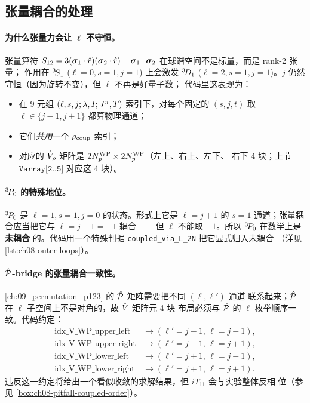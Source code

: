 \subsection{张量耦合的处理}
\label{subsec:ch08-tensor-coupling}

\paragraph{为什么张量力会让 \(\ell\) 不守恒。}
张量算符 \(S_{12} = 3 (\bm{\sigma}_1 \cdot \hat{r})(\bm{\sigma}_2 \cdot \hat{r})
- \bm{\sigma}_1 \cdot \bm{\sigma}_2\) 在球谐空间不是标量，而是 rank-2 张量；
作用在 \({}^{3}\!S_{1}\) (\(\ell=0, s=1, j=1\)) 上会激发 \({}^{3}\!D_{1}\)
(\(\ell=2, s=1, j=1\))。\(j\) 仍然守恒（因为旋转不变），但 \(\ell\) 不再是好量子数；
代码里这表现为：
\begin{itemize}
  \item 在 9 元组 \((\ell, s, j; \lambda, I; J^\pi, T)\) 索引下，对每个固定的 \((s, j, t)\) 取 \(\ell \in \{j-1, j+1\}\) 都算物理通道；
  \item 它们\emph{共用}一个 \(\rho_{\rm coup}\) 索引；
  \item 对应的 \(\hat{V}_\rho\) 矩阵是 \(2 {N_{p}^{\text{WP}}} \times 2 {N_{p}^{\text{WP}}}\)（左上、右上、左下、
        右下 4 块；上节 \(\texttt{Varray[2..5]}\) 对应这 4 块）。
\end{itemize}

\paragraph{\({}^{3}\!P_{0}\) 的特殊地位。}
\({}^{3}\!P_{0}\) 是 \(\ell=1, s=1, j=0\) 的状态。形式上它是
\(\ell = j+1\) 的 \(s=1\) 通道；张量耦合应当把它与 \(\ell=j-1=-1\) 耦合——
但 \(\ell\) 不能取 \(-1\)。所以 \({}^{3}\!P_{0}\) 在数学上是\textbf{未耦合}
的。代码用一个特殊判据 \texttt{coupled\_via\_L\_2N} 把它显式归入未耦合
（详见 \cref{lst:ch08-outer-loops}）。

\paragraph{\(\hat{\mathcal{P}}\)-bridge 的张量耦合一致性。}
\cref{ch:09_permutation_p123} 的 \(\hat{\mathcal{P}}\) 矩阵需要把不同 \((\ell, \ell')\) 通道
联系起来；\(\hat{\mathcal{P}}\) 在 \(\ell\)-子空间上不是对角的，故 \(\hat{V}\) 矩阵元 4 块
布局必须与 \(\hat{\mathcal{P}}\) 的 \(\ell\)-枚举顺序一致。代码约定：
\begin{align*}
\text{idx\_V\_WP\_upper\_left}  &\to (\ell' = j-1,\, \ell = j-1), \\
\text{idx\_V\_WP\_upper\_right} &\to (\ell' = j-1,\, \ell = j+1), \\
\text{idx\_V\_WP\_lower\_left}  &\to (\ell' = j+1,\, \ell = j-1), \\
\text{idx\_V\_WP\_lower\_right} &\to (\ell' = j+1,\, \ell = j+1).
\end{align*}
违反这一约定将给出一个看似收敛的求解结果，但 \(iT_{11}\) 会与实验整体反相
位（参见 \cref{box:ch08-pitfall-coupled-order}）。

